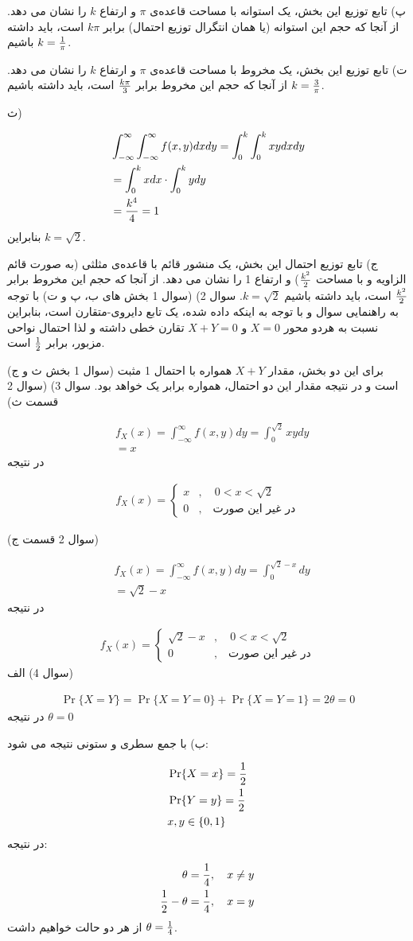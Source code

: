 \documentclass[10pt,letterpaper]{report}
\newcommand{\eqn}[1]{
\[\begin{split}
#1
\end{split}\]
}
\begin{document}
پ) تابع توزیع این بخش، یک استوانه با مساحت قاعده‌ی $\pi$ و ارتفاع $k$ را نشان می دهد. از آنجا که حجم این استوانه (یا همان انتگرال توزیع احتمال) برابر $k\pi$ است، باید داشته باشیم $k={1\over\pi}$.

ت) تابع توزیع این بخش، یک مخروط با مساحت قاعده‌ی $\pi$ و ارتفاع $k$ را نشان می دهد. از آنجا که حجم این مخروط برابر $k\pi\over 3$ است، باید داشته باشیم $k={3\over\pi}$.

ث) 
\eqn{
&\int_{-\infty}^{\infty}\int_{-\infty}^{\infty}f(x,y)dxdy=
\int_{0}^{k}\int_{0}^{k}xydxdy
\\&=
\int_{0}^{k}xdx\cdot \int_{0}^{k}ydy
\\&=
{k^4\over 4}
=1
}{}
بنابراین $k=\sqrt 2$.

ج) تابع توزیع احتمال این بخش، یک منشور قائم با قاعده‌ی مثلثی (به صورت قائم الزاویه و با مساحت $k^2\over 2$) و ارتفاع 1 را نشان می دهد. از آنجا که حجم این مخروط برابر $k^2\over 2$ است، باید داشته باشیم $k=\sqrt 2$.
\newline
\newline
سوال 2) (سوال 1 بخش های ب، پ و ت) با توجه به راهنمایی سوال و با توجه به اینکه  داده شده، یک تابع دایروی-متقارن است، بنابراین نسبت به هردو محور $X=0$ و $X+Y=0$ تقارن خطی داشته و لذا احتمال نواحی مزبور، برابر $1\over 2$ است.

(سوال 1 بخش ث و ج) برای این دو بخش، مقدار $X+Y$ همواره با احتمال 1 مثبت است و در نتیجه مقدار این دو احتمال، همواره برابر یک خواهد بود.
\newline
\newline
سوال 3) (سوال 2 قسمت ث)
\eqn{
&f_X(x)=\int_{-\infty}^\infty f(x,y)dy=\int_{0}^{\sqrt 2} xydy
\\&=x
}{}
در نتیجه
\eqn{
f_X(x)=\begin{cases}
x&,\quad 0<x<\sqrt2
\\0&,\quad \text{در غیر این صورت}
\end{cases}
}{}

(سوال 2 قسمت ج)
\eqn{
&f_X(x)=\int_{-\infty}^\infty f(x,y)dy=\int_{0}^{\sqrt 2-x} dy
\\&=\sqrt 2-x
}{}
در نتیجه
\eqn{
f_X(x)=\begin{cases}
\sqrt2-x&,\quad 0<x<\sqrt2
\\0&,\quad \text{در غیر این صورت}
\end{cases}
}{}
\newline\newline
سوال 4) الف)
\eqn{
\Pr\{X=Y\}=\Pr\{X=Y=0\}+\Pr\{X=Y=1\}=2\theta=0
}{}
در نتیجه $\theta=0$

ب) با جمع سطری و ستونی نتیجه می شود:
\eqn{
&\Pr\{X=x\}={1\over 2}
\\&\Pr\{Y=y\}={1\over 2}
\\& x,y\in\{0,1\}
}{}
 در نتیجه:
\eqn{
\theta={1\over 4}&,\quad x\ne y
\\{1\over 2}-\theta={1\over 4}&,\quad x=y
}{}
از هر دو حالت خواهیم داشت $\theta={1\over 4}$.
\end{document}
